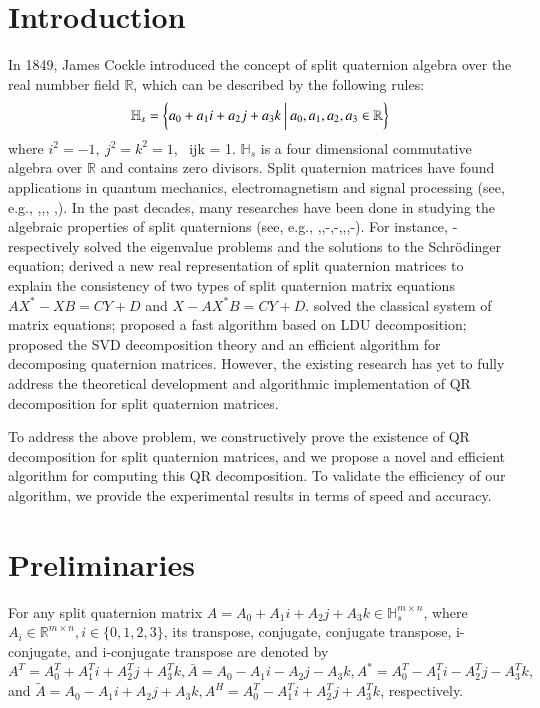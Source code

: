\documentclass[5p]{elsarticle}
\numberwithin{equation}{section}
\begin{document}

\section{Introduction}
In 1849, James Cockle \cite{Cockle1849} introduced the concept of split quaternion algebra over the real numbber field $\mathbb{R}$,   which can be described by the following rules:
\begin{equation*}
    \small
    \mathbb{H}_s = \left\{ a_0 + a_1 i + a_2 j + a_3 k \ \bigg|\ a_0, a_1, a_2, a_3 \in \mathbb{R} \right\} 
\end{equation*} 
where $i^2 = -1,\ j^2 = k^2 = 1$, \ ijk = 1.
$\mathbb{H}_s$ is a four dimensional commutative algebra over $\mathbb{R}$ and contains zero divisors. 
Split quaternion matrices have found applications in quantum mechanics, electromagnetism and signal processing (see, e.g., \cite{Gog2022},\cite{Hasebe2010},\cite{Le2022},
\cite{Z2022},\cite{Wang2023}). In the past decades, many researches  have been done in studying the algebraic properties of split quaternions (see, e.g., \cite{Abłamowicz2020},\cite{Yasemin2012},\cite{TJiang2015}-\cite{TJiang2018},\cite{Zhuo2020}-\cite{Xin2019},\cite{mma},\cite{wang},\cite{Wang2021}-\cite{Zhang2015}). For instance, \cite{Jiang2018}-\cite{TJiang2018} respectively solved the eigenvalue problems and the solutions to the Schrödinger equation; \cite{Xin2019} derived a new real representation of split quaternion matrices to explain the consistency of two types of split quaternion matrix equations \(AX^* - XB = CY + D\) and \(X - AX^*B = CY + D\).\cite{wang} solved the classical system of matrix equations; \cite{Wang2021} proposed a fast algorithm based on LDU decomposition; \cite{Gang2024}  proposed the SVD decomposition theory and an efficient algorithm for decomposing quaternion matrices. However, the existing research has yet to fully address the theoretical development and algorithmic implementation of QR decomposition for split quaternion matrices.

To address the above problem, we constructively prove the existence of QR decomposition for split quaternion matrices, and we propose a novel and efficient algorithm for computing this QR decomposition.  To validate the efficiency  of our algorithm, we provide the experimental results in terms of speed and accuracy.

\section{Preliminaries}
For any split quaternion matrix ${A}=A_{0}+A_{1}i + A_{2}j + A_{3}k \in\mathbb{H}_{s}^{m\times n}$, where $A_{i}\in\mathbb{R}^{m\times n}, i\in\{0,1,2,3\}$, its transpose, conjugate, conjugate transpose, i-conjugate, and i-conjugate transpose are  denoted by 
 ${A}^T = A_0^T + A_1^Ti + A_2^Tj + A_3^Tk,\bar{{A}} = A_0 - A_1i - A_2j - A_3k, {A}^* = A_0^T - A_1^Ti - A_2^Tj - A_3^Tk,$ and $\tilde{{A}} = A_0 - A_1i + A_2j + A_3k,{A}^H = A_0^T - A_1^Ti + A_2^Tj + A_3^Tk$, respectively.
\end{document}

